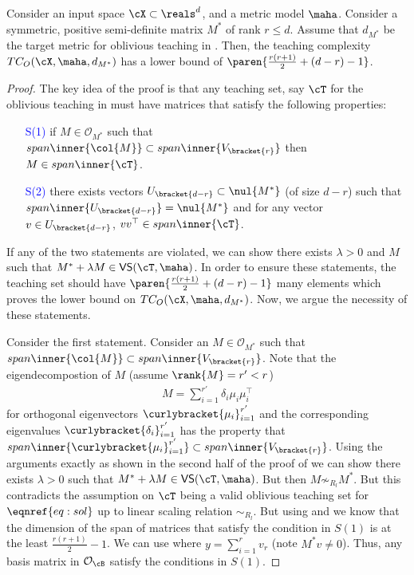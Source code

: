 \begin{lemma}\label{lemma: lowerbound}
    Consider an input space $\cX \subset \reals^d$, and a metric model $\maha$.
    Consider a symmetric, positive semi-definite matrix $M^*$ of rank $r \le d$. Assume that $d_{M^*}$ be the target metric for oblivious teaching in . Then, the teaching complexity $TC_O(\cX, \maha, d_{M^*})$ has a lower bound of $\paren{\frac{r(r+1)}{2} + (d - r) - 1}$.
\end{lemma}
\begin{proof}
    The key idea of the proof is that any teaching set, say $\cT$ for the oblivious teaching in  must have matrices that satisfy the following properties:
    \begin{enumerate}
        \item[\textcolor{blue}{S(1)}] if $M \in \mathcal{O}_{M^*}$ such that $span\inner{\col{M}} \subset span\inner{V_{\bracket{r}}}$ then $M \in span \inner{\cT}$.
        \item[\textcolor{blue}{S(2)}] there exists vectors $U_{\bracket{d-r}} \subset \nul{M^*}$ (of size $d - r $) such that $span \inner{U_{\bracket{d-r}} } = \nul{M^*}$ and 
        for any vector $v \in U_{\bracket{d-r}}$, $vv^{\top} \in span \inner{\cT}$.
    \end{enumerate}
    If any of the two statements are violated, we can show there exists $\lambda > 0$ and $M$ such that $M^* + \lambda M \in \sf{VS}(\cT,\maha)$. In  order to ensure these statements, the teaching set should have $\paren{\frac{r(r+1)}{2} + (d - r) - 1}$ many elements which proves the lower bound on $TC_O(\cX, \maha, d_{M^*})$. Now, we argue the necessity of these statements.

    Consider the first statement. Consider an $M \in \mathcal{O}_{M^*}$ such that $span\inner{\col{M}} \subset span\inner{V_{\bracket{r}}}$. Note that the eigendecompostion of $M$ (assume $\rank{M} = r' < r$)
     \begin{align*}
         M = \sum_{i = 1}^{r'} \delta_i\mu_i\mu_i^{\top}
     \end{align*}
     for orthogonal eigenvectors $\curlybracket{\mu_i}_{i=1}^{r'}$ and the corresponding eigenvalues $\curlybracket{\delta_i}_{i=1}^{r'}$ has the property that $span \inner{\curlybracket{\mu_i}_{i=1}^{r'}} \subset span \inner{V_{\bracket{r}}}$. Using the arguments exactly as shown in the second half of the proof of  we can show there exists $\lambda > 0$ such that $M^* + \lambda M \in \sf{VS}(\cT, \maha)$. But then $M \not\sim_{R_l} M^*$. But this contradicts the assumption on $\cT$ being a valid oblivious teaching set for $\eqnref{eq: sol}$ up to linear scaling relation $\sim_{R_l}$. But using  and  we know that the dimension of the span of matrices that satisfy the condition in $S(1)$ is at the least $\frac{r(r+1)}{2} -1$. We can use  where $y = \sum_{i = 1}^r v_r$ (note $M^*v \neq 0$). Thus, any basis matrix in $\mathcal{O}_{\cB}$ satisfy the conditions in $S(1)$.


\end{proof}
